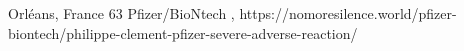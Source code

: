           {Orléans, France}
          {63}
          {Pfizer/BioNtech}
          {}
          {
            ,
          }
          {https://nomoresilence.world/pfizer-biontech/philippe-clement-pfizer-severe-adverse-reaction/}

